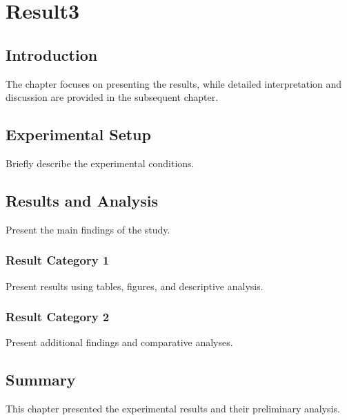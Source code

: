 \chapter{Result3}
\label{chapter:result3}

\section{Introduction}
The chapter focuses on presenting the results, while detailed interpretation and discussion are provided in the subsequent chapter.

\section{Experimental Setup}
Briefly describe the experimental conditions.

\section{Results and Analysis}
Present the main findings of the study. 

\subsection{Result Category 1}
Present results using tables, figures, and descriptive analysis.

\subsection{Result Category 2}
Present additional findings and comparative analyses.

\section{Summary}
This chapter presented the experimental results and their preliminary analysis. 